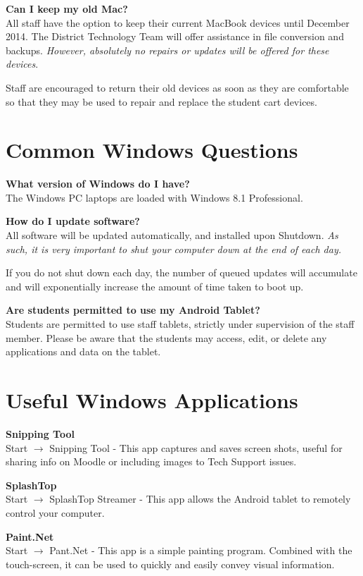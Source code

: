 \documentclass[10pt,foldmark,notumble]{leaflet}
\begin{document}
\textbf{Can I keep my old Mac?}\\
All staff have the option to keep their current MacBook devices until December 2014. The District Technology Team will offer assistance in file conversion and backups. \emph{However, absolutely no repairs or updates will be offered for these devices}.

Staff are encouraged to return their old devices as soon as they are comfortable so that they may be used to repair and replace the student cart devices.

\section{Common Windows Questions\color{red}\hrulefill\color{black}}
\textbf{What version of Windows do I have?}\\
The Windows PC laptops are loaded with Windows 8.1 Professional.

\textbf{How do I update software?}\\
All software will be updated automatically, and installed upon Shutdown. \emph{As such, it is very important to shut your computer down at the end of each day.}

If you do not shut down each day, the number of queued updates will accumulate and will exponentially increase the amount of time taken to boot up.

\textbf{Are students permitted to use my Android Tablet?}\\
Students are permitted to use staff tablets, strictly under supervision of the staff member. Please be aware that the students may access, edit, or delete any applications and data on the tablet.

\section{Useful Windows Applications\color{red}\hrulefill\color{black}}
\textbf{Snipping Tool}\\
Start $\to$ Snipping Tool - This app captures and saves screen shots, useful for sharing info on Moodle or including images to Tech Support issues.

\textbf{SplashTop}\\
Start $\to$ SplashTop Streamer - This app allows the Android tablet to remotely control your computer.

\textbf{Paint.Net}\\
Start $\to$ Pant.Net - This app is a simple painting program. Combined with the touch-screen, it can be used to quickly and easily convey visual information.
\end{document}

